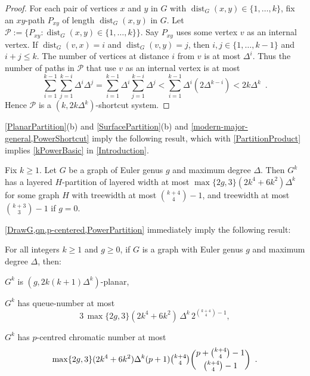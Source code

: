\documentclass{patmorin}
\newcommand{\note}[2]{{\color{red}[#1:~#2]}}
\DeclareMathOperator{\dist}{dist}
\DeclareMathOperator{\qn}{qn}
\DeclarePairedDelimiter{\floor}{\lfloor}{\rfloor}
\newcommand{\PP}{\mathcal{P}}
\renewcommand{\le}{\leqslant}
\renewcommand{\geq}{\geqslant}
\renewcommand{\leq}{\leqslant}
\begin{document}
\begin{proof}
For each pair of vertices $x$ and $y$ in $G$ with $\dist_G(x,y)\in\{1,\dots,k\}$, fix an $xy$-path $P_{xy}$ of length 
$\dist_G(x,y)$  in $G$. Let $\PP:=\{P_{xy}: \dist_G(x,y)\in\{1,\dots,k\} \}$. Say $P_{xy}$ uses some vertex $v$ as an internal vertex. If $\dist_G(v,x)=i$ and $\dist_G(v,y)=j$, then $i,j\in\{1,\dots,k-1\}$ and $i+j\leq k$. The number of vertices at distance $i$ from $v$ is at most $\Delta^i$. Thus the number of paths in $\PP$ that use $v$ as an internal vertex is at most 
$$\sum_{i=1}^{k-1} \sum_{j=1}^{k-i} \Delta^i\Delta^j 
= \sum_{i=1}^{k-1} \Delta^i \sum_{j=1}^{k-i} \Delta^j 
< \sum_{i=1}^{k-1} \Delta^i ( 2 \Delta^{k-i} )
< 2k \Delta^k\enspace.$$
Hence $\PP$ is a $(k, 2k \Delta^k)$-shortcut system. 
\end{proof}

\cref{PlanarPartition}(b) and \cref{SurfacePartition}(b) and \cref{modern-major-general,PowerShortcut} imply the following result, which with \cref{PartitionProduct} implies \cref{kPowerBasic} in \cref{Introduction}.

\begin{thm}
\label{PowerPartition}
Fix $k\geq 1$. Let $G$ be a graph of Euler genus $g$ and maximum degree $\Delta$. 
Then $G^k$ has a layered $H$-partition of layered width at most $\max\{2g,3\} (2k^4+6k^2) \Delta^{k}$ 
for some graph $H$ with treewidth at most $\binom{k+4}{4}-1$, and treewidth 
at most $\binom{k+3}{3}-1$ if $g=0$. 
\end{thm}

\cref{DrawG,qn,p-centered,PowerPartition} immediately imply the following result:



\begin{cor}
For all integers $k\geq 1$ and $g\geq 0$, if $G$ is a graph with Euler genus $g$ and maximum degree $\Delta$, then:
\begin{compactitem}
\item $G^k$ is $(g, 2k(k+1)\Delta^{k} )$-planar, 
\item $G^k$ has queue-number at most 
$$3\,\max\{2g,3\} (2k^4+6k^2) \,\Delta^{k}\, 2^{\binom{k+4}{4}-1},$$
\item $G^k$ has  $p$-centred chromatic number at most 
$$\max\{2g,3\}(2k^4+6k^2) \Delta^{k}  (p+1) \tbinom{k+4}{4} 
\binom{p+\binom{k+4}{4}-1}{\binom{k+4}{4}-1}\enspace.$$
\end{compactitem}
\end{cor}
\end{document}
